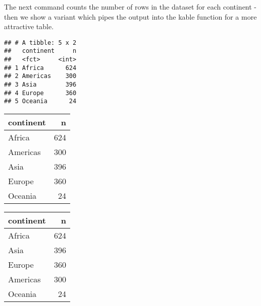 \documentclass[]{book}
\newenvironment{Shaded}{\begin{snugshade}}{\end{snugshade}}
\newcommand{\KeywordTok}[1]{\textcolor[rgb]{0.13,0.29,0.53}{\textbf{#1}}}
\newcommand{\DataTypeTok}[1]{\textcolor[rgb]{0.13,0.29,0.53}{#1}}
\newcommand{\StringTok}[1]{\textcolor[rgb]{0.31,0.60,0.02}{#1}}
\newcommand{\CommentTok}[1]{\textcolor[rgb]{0.56,0.35,0.01}{\textit{#1}}}
\newcommand{\OtherTok}[1]{\textcolor[rgb]{0.56,0.35,0.01}{#1}}
\newcommand{\OperatorTok}[1]{\textcolor[rgb]{0.81,0.36,0.00}{\textbf{#1}}}
\newcommand{\NormalTok}[1]{#1}
\begin{document}
The next command counts the number of rows in the dataset for each
continent - then we show a variant which pipes the output into the kable
function for a more attractive table.

\begin{Shaded}
\end{Shaded}

\begin{verbatim}
## # A tibble: 5 x 2
##   continent     n
##   <fct>     <int>
## 1 Africa      624
## 2 Americas    300
## 3 Asia        396
## 4 Europe      360
## 5 Oceania      24
\end{verbatim}

\begin{Shaded}
\end{Shaded}

\begin{tabular}{l|r}
\hline
continent & n\\
\hline
Africa & 624\\
\hline
Americas & 300\\
\hline
Asia & 396\\
\hline
Europe & 360\\
\hline
Oceania & 24\\
\hline
\end{tabular}

\begin{Shaded}
\end{Shaded}

\begin{tabular}{l|r}
\hline
continent & n\\
\hline
Africa & 624\\
\hline
Asia & 396\\
\hline
Europe & 360\\
\hline
Americas & 300\\
\hline
Oceania & 24\\
\hline
\end{tabular}
\end{document}
